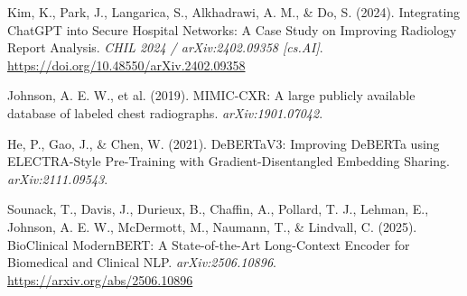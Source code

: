 \documentclass[letterpaper]{article} %
\begin{document}
\begin{thebibliography}{9}

Kim, K., Park, J., Langarica, S., Alkhadrawi, A. M., \& Do, S. (2024).
\newblock Integrating ChatGPT into Secure Hospital Networks: A Case Study on Improving Radiology Report Analysis.
\newblock \textit{CHIL 2024 / arXiv:2402.09358 [cs.AI]}.
\newblock \url{https://doi.org/10.48550/arXiv.2402.09358}

Johnson, A. E. W., et al. (2019).
\newblock MIMIC-CXR: A large publicly available database of labeled chest radiographs.
\newblock \textit{arXiv:1901.07042}.

He, P., Gao, J., \& Chen, W. (2021).
\newblock DeBERTaV3: Improving DeBERTa using ELECTRA-Style Pre-Training with Gradient-Disentangled Embedding Sharing.
\newblock \textit{arXiv:2111.09543}.

Sounack, T., Davis, J., Durieux, B., Chaffin, A., Pollard, T. J., Lehman, E., Johnson, A. E. W., McDermott, M., Naumann, T., \& Lindvall, C. (2025).
\newblock BioClinical ModernBERT: A State-of-the-Art Long-Context Encoder for Biomedical and Clinical NLP.
\newblock \textit{arXiv:2506.10896}.
\newblock \url{https://arxiv.org/abs/2506.10896}

\end{thebibliography}
\end{document}
